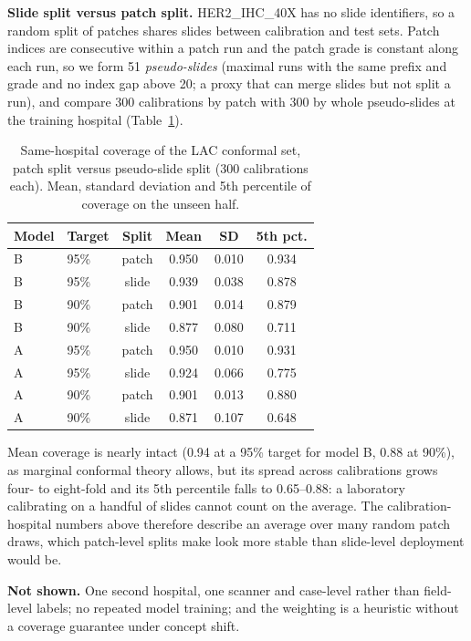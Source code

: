 \documentclass[conference]{IEEEtran}
\begin{document}
\textbf{Slide split versus patch split.} HER2\_IHC\_40X has no slide identifiers, so a random split of patches shares slides between
calibration and test sets. Patch indices are consecutive within a patch run and the patch grade is constant along each run, so we form
51 \emph{pseudo-slides} (maximal runs with the same prefix and grade and no index gap above 20; a proxy that can merge slides but not split a run),
and compare 300 calibrations by patch with 300 by whole pseudo-slides at the training hospital
(Table~\ref{tab:grouped}).

\begin{table}[t]
\centering
\caption{Same-hospital coverage of the LAC conformal set, patch split versus pseudo-slide split (300 calibrations each). Mean, standard
deviation and 5th percentile of coverage on the unseen half.}
\label{tab:grouped}
\footnotesize\setlength{\tabcolsep}{3pt}
\begin{tabular}{llcccc}
\toprule
Model & Target & Split & Mean & SD & 5th pct.\\
\midrule
B & 95\% & patch & 0.950 & 0.010 & 0.934\\
B & 95\% & slide & 0.939 & 0.038 & 0.878\\
B & 90\% & patch & 0.901 & 0.014 & 0.879\\
B & 90\% & slide & 0.877 & 0.080 & 0.711\\
A & 95\% & patch & 0.950 & 0.010 & 0.931\\
A & 95\% & slide & 0.924 & 0.066 & 0.775\\
A & 90\% & patch & 0.901 & 0.013 & 0.880\\
A & 90\% & slide & 0.871 & 0.107 & 0.648\\
\bottomrule
\end{tabular}
\end{table}

Mean coverage is nearly intact (0.94 at a 95\% target for model B, 0.88 at 90\%), as marginal conformal theory allows, but its spread across calibrations
grows four- to eight-fold and its 5th percentile falls to 0.65--0.88: a laboratory calibrating on a handful of slides cannot count on the average.
The calibration-hospital numbers above therefore describe an average over many random patch draws, which patch-level splits make look more
stable than slide-level deployment would be.

\textbf{Not shown.} One second hospital, one scanner and case-level rather than
field-level labels; no repeated model training; and the weighting is a heuristic
without a coverage guarantee under concept shift.
\end{document}
